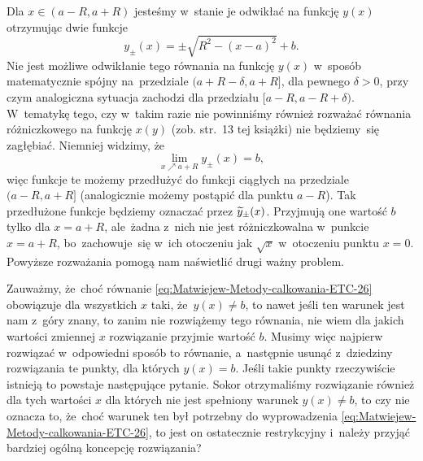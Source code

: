 \documentclass[a4paper,11pt]{article}
\numberwithin{equation}{section}
\begin{document}
Dla $x \in ( a - R, a + R )$ jesteśmy w~stanie je odwikłać na funkcję
$y( x )$ otrzymując dwie funkcje
\begin{equation}
  \label{eq:Matwiejew-Metody-calkowania-ETC-28}
  y_{ \pm }( x ) = \pm\sqrt{ R^{ 2 } - ( x - a )^{ 2 } } + b.
\end{equation}
Nie jest możliwe odwikłanie tego równania na funkcję $y( x )$ w~sposób
matematycznie spójny na~przedziale $( a + R - \delta, a + R ]$, dla pewnego
$\delta > 0$, przy czym analogiczna sytuacja zachodzi dla przedziału
$[ a - R, a - R + \delta )$. W~tematykę tego, czy w~takim razie nie powinniśmy
również rozważać równania różniczkowego na funkcję $x( y )$ (zob. str.~13
tej książki) nie będziemy~się zagłębiać. Niemniej widzimy, że
\begin{equation}
  \label{eq:Matwiejew-Metody-calkowania-ETC-29}
  \lim_{ x \nearrow a + R } y_{ \pm }( x ) = b,
\end{equation}
więc funkcje te możemy przedłużyć do funkcji ciągłych na przedziale
$( a - R, a + R ]$ (analogicznie możemy postąpić dla punktu $a - R$).
Tak przedłużone funkcje będziemy oznaczać przez $\widetilde{y}_{ \pm }( x )$.
Przyjmują one wartość $b$ tylko dla $x = a + R$, ale~żadna z~nich nie jest
różniczkowalna w~punkcie $x = a + R$, bo~zachowuje~się w~ich otoczeniu jak
$\sqrt{ x }$ w~otoczeniu punktu $x = 0$. Powyższe rozważania pomogą nam
naświetlić drugi ważny problem.

Zauważmy, że~choć równanie \eqref{eq:Matwiejew-Metody-calkowania-ETC-26}
obowiązuje dla wszystkich $x$ taki, że~$y( x ) \neq b$, to nawet jeśli ten
warunek jest nam z~góry znany, to zanim nie rozwiążemy tego równania, nie
wiem dla jakich wartości zmiennej $x$ rozwiązanie przyjmie wartość $b$.
Musimy więc najpierw rozwiązać w~odpowiedni sposób to równanie, a~następnie
usunąć z~dziedziny rozwiązania te punkty, dla których $y( x ) = b$. Jeśli
takie punkty rzeczywiście istnieją to powstaje następujące pytanie. Sokor
otrzymaliśmy rozwiązanie również dla tych wartości $x$ dla
których nie jest spełniony warunek $y( x ) \neq b$, to czy nie oznacza to,
że~choć warunek ten był potrzebny do wyprowadzenia
\eqref{eq:Matwiejew-Metody-calkowania-ETC-26}, to jest on ostatecznie
restrykcyjny i~należy przyjąć bardziej ogólną koncepcję rozwiązania?
\end{document}
